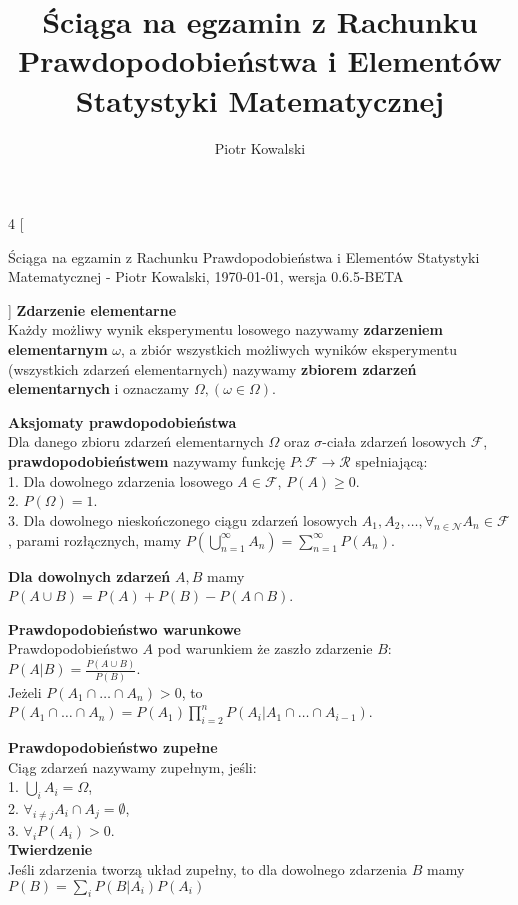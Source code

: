 \documentclass[10pt,landscape,a4paper,notitlepage]{article}
\author{Piotr Kowalski}
\title{Ściąga na egzamin z Rachunku Prawdopodobieństwa i Elementów Statystyki Matematycznej}
\begin{document}
    \begin{multicols*}{4}
        [
        \begin{center}
            Ściąga na egzamin z Rachunku Prawdopodobieństwa i Elementów Statystyki Matematycznej - Piotr Kowalski, \today , wersja 0.6.5-BETA
        \end{center}
        ]
        \noindent\textbf{\large Zdarzenie elementarne}\\
        Każdy możliwy wynik eksperymentu losowego nazywamy \textbf{zdarzeniem elementarnym} $\omega$, a zbiór wszystkich możliwych wyników eksperymentu (wszystkich zdarzeń elementarnych) nazywamy \textbf{zbiorem zdarzeń elementarnych} i oznaczamy $\Omega, (\omega\in\Omega)$.
        
        \noindent\textbf{\large Aksjomaty prawdopodobieństwa}\\
        Dla danego zbioru zdarzeń elementarnych $\Omega$ oraz $\sigma$-ciała zdarzeń losowych $\mathcal{F}$, \textbf{prawdopodobieństwem} nazywamy funkcję $P:\mathcal{F}\rightarrow \mathcal{R}$ spełniającą:\\
        1. Dla dowolnego zdarzenia losowego $A\in\mathcal{F}$, $P(A)\geq 0$.\\
        2. $P(\Omega)=1$.\\
        3. Dla dowolnego nieskończonego ciągu zdarzeń losowych $A_1, A_2, \ldots, \forall_{n\in\mathcal{N}} A_n\in\mathcal{F}$, parami rozłącznych, mamy $P\left(\bigcup^\infty_{n=1}A_n\right)=\sum^\infty_{n=1}P(A_n)$.

        \noindent \textbf{Dla dowolnych zdarzeń} $A, B$ mamy\\ $P(A\cup B)=P(A)+P(B)-P(A\cap B)$.

        \noindent \textbf{\large Prawdopodobieństwo warunkowe}\\
        Prawdopodobieństwo $A$ pod warunkiem że zaszło zdarzenie $B$: $P(A|B)=\frac{P(A\cup B)}{P(B)}$.\\
        Jeżeli $P(A_1\cap \ldots \cap A_n)>0$, to $P(A_1\cap \ldots \cap A_n) = P(A_1)\prod_{i=2}^nP(A_i|A_1 \cap\ldots\cap A_{i-1})$.

        \noindent \textbf{\large Prawdopodobieństwo zupełne}\\
        Ciąg zdarzeń nazywamy zupełnym, jeśli:\\
        1. $\bigcup_i A_i = \Omega$,\\
        2. $\forall_{i\neq j}A_i \cap A_j = \emptyset$,\\
        3. $\forall_i P(A_i)>0$.\\
        \textbf{Twierdzenie}\\
        Jeśli zdarzenia tworzą układ zupełny, to dla dowolnego zdarzenia $B$ mamy $P(B)=\sum_iP(B|A_i)P(A_i)$


\end{multicols*}
\end{document}
